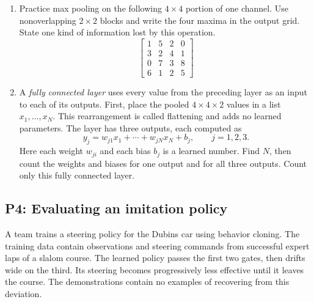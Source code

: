 \documentclass[11pt]{article}
\newenvironment{studentanswer}[1]
  {\par\medskip\noindent
   \begin{tcolorbox}[height from=#1 to 100cm, colback=white, colframe=gray!60,
     boxrule=0.6pt, arc=0pt, outer arc=0pt, left=7pt, right=7pt,
     top=7pt, bottom=7pt, title={Answer / work}, fonttitle=\small,
     coltitle=black, colbacktitle=gray!8, titlerule=0pt]
   \ignorespaces}
  {\end{tcolorbox}\par}
\begin{document}
\begin{enumerate}[label=(\alph*),start=2]
\item \begin{minipage}[t]{\linewidth} Practice max pooling on the following $4\times4$ portion of one
channel. Use nonoverlapping $2\times2$ blocks and write the four maxima
in the output grid. State one kind of information lost by this operation.
\[
\begin{bmatrix}1&5&2&0\\3&2&4&1\\0&7&3&8\\6&1&2&5\end{bmatrix}
\]

\begin{studentanswer}{4.5cm}
\begin{center}
\end{center}
\end{studentanswer}

\end{minipage}
\item \begin{minipage}[t]{\linewidth} A \emph{fully connected layer} uses every value from the preceding
layer as an input to each of its outputs. First, place the pooled
$4\times4\times2$ values in a list $x_1,\ldots,x_N$. This rearrangement
is called flattening and adds no learned parameters. The layer has
three outputs, each computed as
\[
y_j=w_{j1}x_1+\cdots+w_{jN}x_N+b_j,\qquad j=1,2,3.
\]
Here each weight $w_{ji}$ and each bias $b_j$ is a learned number.
Find $N$, then count the weights and biases for one output and for
all three outputs. Count only this fully connected layer.

\begin{studentanswer}{4cm}
\end{studentanswer}

\end{minipage}
\end{enumerate}

\clearpage
\subsection*{P4: Evaluating an imitation policy}

A team trains a steering policy for the Dubins car using behavior cloning.
The training data contain observations and steering commands from
successful expert laps of a slalom course. The learned policy passes the
first two gates, then drifts wide on the third. Its steering becomes
progressively less effective until it leaves the course. The demonstrations
contain no examples of recovering from this deviation.
\end{document}
